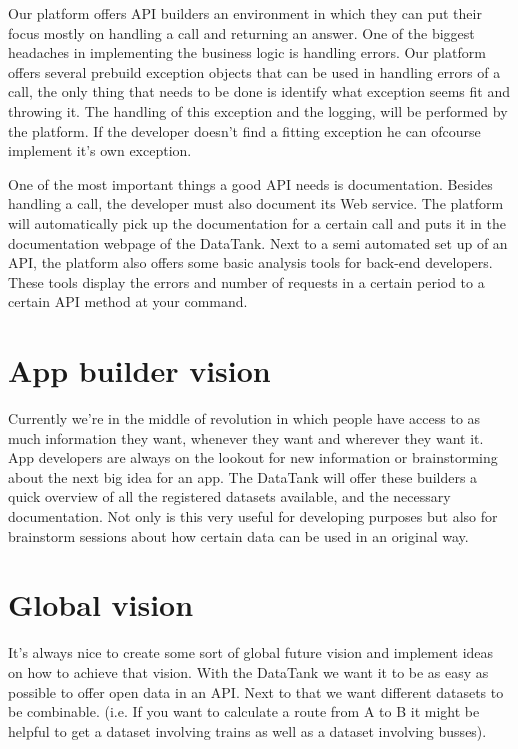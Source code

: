 \documentclass[12pt]{book}
\begin{document}
Our platform offers API builders an environment in which they can put their focus mostly on handling a call and returning an answer. One of the biggest headaches in implementing the business logic is handling errors. Our platform offers several prebuild exception objects that can be used in handling errors of a call, the only thing that needs to be done is identify what exception seems fit and throwing it. The handling of this exception and the logging, will be performed by the platform. If the developer doesn't find a fitting exception he can ofcourse implement it's own exception.

One of the most important things a good API needs is documentation. Besides handling a call, the developer must also document its Web service. The platform will automatically pick up the documentation for a certain call and puts it in the documentation webpage of the DataTank.
Next to a semi automated set up of an API, the platform also offers some basic analysis tools for back-end developers. These tools display the errors and number of requests in a certain period to a certain API method at your command.

\section{App builder vision }
Currently we're in the middle of revolution in which people have access to as much information they want, whenever they want and wherever they want it. App developers are always on the lookout for new information or brainstorming about the next big idea for an app. The DataTank will offer these builders a quick overview of all the registered datasets available, and the necessary documentation. Not only is this very useful for developing purposes but also for brainstorm sessions about how certain data can be used in an original way.

\section{Global vision} 
It's always nice to create some sort of global future vision and implement ideas on how to achieve that vision. With the DataTank we want it to be as easy as possible to offer open data in an API. Next to that we want different datasets to be combinable. (i.e. If you want to calculate a route from A to B it might be helpful to get a dataset involving trains as well as a dataset involving busses). 
\end{document}
